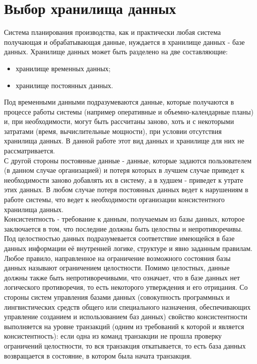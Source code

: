 
\section{Выбор хранилища данных}

\indent Система планирования производства, как и практически любая система получающая и обрабатывающая данные, нуждается в хранилище данных - базе данных.
Хранилище данных может быть разделено на две составляющие:
\begin{itemize}
	\item хранилище временных данных;
	\item хранилище постоянных данных.
\end{itemize}

\indent Под временными данными подразумеваются данные, которые получаются в процессе работы системы (например оперативные и объемно-календарные планы) и, при необходимости, могут быть рассчитаны заново, хоть и с некоторыми затратами (время, вычислительные мощности), при условии отсутствия хранилища данных.
В данной работе этот вид данных и хранилище для них не рассматривается.\\
\indent С другой стороны постоянные данные - данные, которые задаются пользователем (в данном случае организацией) и потеря которых в лучшем случае приведет к необходимости заново добавлять их в систему, а в худшем - приведет к утрате этих данных.
В любом случае потеря постоянных данных ведет к нарушениям в работе системы, что ведет к необходимости организации консистентного хранилища данных.\\
\indent Консистентность - требование к данным, получаемым из базы данных, которое заключается в том, что последние должны быть целостны и непротиворечивы.
Под целостностью данных подразумевается соответствие имеющейся в базе данных информации её внутренней логике, структуре и явно заданным правилам.
Любое правило, направленное на ограничение возможного состояния базы данных называют ограничением целостности.
Помимо целостных, данные должны также быть непротиворечивыми, что означает, что в базе данных нет логического противоречия, то есть некоторого утверждения и его отрицания.
Со стороны систем управления базами данных (совокупность программных и лингвистических средств общего или специального назначения, обеспечивающих управление созданием и использованием баз данных) свойство консистентности выполняется на уровне транзакций (одним из требований к которой и является консистентность): если одна из команд транзакции не прошла проверку ограничений целостности, то вся транзакция откатывается, то есть база данных возвращается в состояние, в котором была начата транзакция.\\
